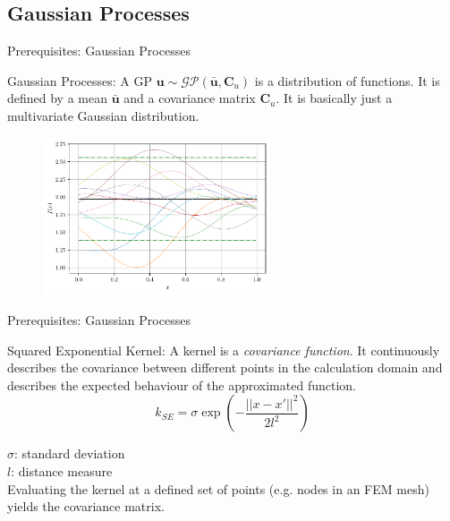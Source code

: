 \documentclass[fleqn,11pt,aspectratio=43]{beamer}
\begin{document}
\subsection{Gaussian Processes}
\begin{frame}{Prerequisites: Gaussian Processes}
\begin{block}{Gaussian Processes:}
A GP $\bm{u} \sim \mathcal{GP}(\bar{\bm{u}},\bm{C}_u)$ is a distribution of functions. It is defined by a mean $\bar{\bm{u}}$ and a covariance matrix $\bm{C}_u$. It is basically just a multivariate Gaussian distribution.

\end{block}
\begin{figure}[h]
\begin{center}
\includegraphics[width=0.6\textwidth]{sqexp_f_sampled}
\end{center}
\end{figure}

\end{frame}

\begin{frame}{Prerequisites: Gaussian Processes}
\begin{block}{Squared Exponential Kernel:}
A kernel is a \emph{covariance function}.  It continuously describes the covariance between different points in the calculation domain and describes the expected behaviour of the approximated function.
\begin{equation}
k_{SE} = \sigma \exp \left( -\frac{||x-x'||^2}{2l^2} \right)
\end{equation}
\end{block}
$\sigma$: standard deviation\\
$l$: distance measure\\
Evaluating the kernel at a defined set of points (e.g. nodes in an FEM mesh) yields the covariance matrix.
\end{frame}
\end{document}
